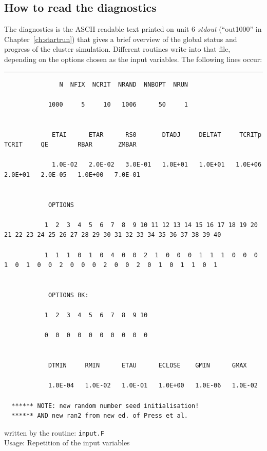 
\begin{landscape}


\section{How to read the diagnostics}

The diagnostics is the ASCII readable text printed on unit 6
{\it stdout} (``out1000'' in Chapter~\ref{ch:startrun}) that
gives a brief overview of the global status and progress of
the cluster simulation.
Different routines write into that file, depending on the options
chosen as the input variables. The following lines occur:\\

\noindent
\hrule
\begin{minipage}{18cm}
{\tiny
\begin{verbatim}
               N  NFIX  NCRIT  NRAND  NNBOPT  NRUN

            1000     5     10   1006      50     1


             ETAI      ETAR      RS0       DTADJ     DELTAT     TCRITp    TCRIT     QE        RBAR       ZMBAR

             1.0E-02   2.0E-02   3.0E-01   1.0E+01   1.0E+01   1.0E+06   2.0E+01   2.0E-05   1.0E+00   7.0E-01


            OPTIONS

           1  2  3  4  5  6  7  8  9 10 11 12 13 14 15 16 17 18 19 20 21 22 23 24 25 26 27 28 29 30 31 32 33 34 35 36 37 38 39 40

           1  1  1  0  1  0  4  0  0  2  1  0  0  0  1  1  1  0  0  0  1  0  1  0  0  2  0  0  0  2  0  0  2  0  1  0  1  1  0  1


            OPTIONS BK:

           1  2  3  4  5  6  7  8  9 10

           0  0  0  0  0  0  0  0  0  0


            DTMIN     RMIN      ETAU      ECLOSE    GMIN      GMAX

            1.0E-04   1.0E-02   1.0E-01   1.0E+00   1.0E-06   1.0E-02

  ****** NOTE: new random number seed initialisation!
  ****** AND new ran2 from new ed. of Press et al.
\end{verbatim}
}
\end{minipage} \hfill
%
\begin{minipage}{4.5cm}
\begin{center}
written by the routine:
{\tt input.F}\\[2ex]
Usage: Repetition of the input variables
\end{center}
\end{minipage}


\end{landscape}
